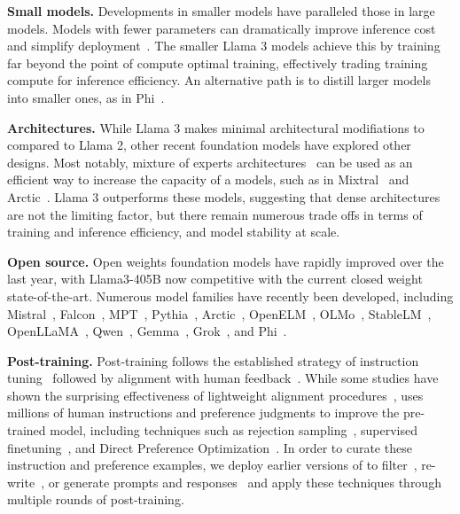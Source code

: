 \documentclass[dvipsnames]{fairmeta}
\begin{document}
\textbf{Small models.}
Developments in smaller models have paralleled those in large models. 
Models with fewer parameters can dramatically improve inference cost and simplify deployment~\citep{mehta2024openelm,team2024gemma}.
The smaller Llama 3 models achieve this by training far beyond the point of compute optimal training, effectively trading training compute for inference efficiency.
An alternative path is to distill larger models into smaller ones, as in Phi~\citep{abdin2024phi}.

\textbf{Architectures.}
While Llama 3 makes minimal architectural modifiations to compared to Llama 2, other recent foundation models have explored other designs. Most notably, mixture of experts architectures~\citep{shazeer2017moe,lewis2021base,fedus2022switch,zhou2022mixture} can be used as an efficient way to increase the capacity of a models, such as in Mixtral~\citep{jiang2024mixtral} and Arctic~\citep{snowflakearctic}. Llama 3 outperforms these models, suggesting that dense architectures are not the limiting factor, but there remain numerous trade offs in terms of training and inference efficiency, and model stability at scale.

\textbf{Open source.}
Open weights foundation models have rapidly improved over the last year, with Llama3-405B now competitive with the current closed weight state-of-the-art. 
Numerous model families have recently been developed, including Mistral~\citep{jiang2023mistral}, Falcon~\citep{almazrouei2023falcon}, MPT~\citep{databricksmpt}, Pythia~\citep{biderman2023pythia}, Arctic~\citep{snowflakearctic}, OpenELM~\citep{mehta2024openelm}, OLMo~\citep{groeneveld2024olmoacceleratingsciencelanguage}, StableLM~\citep{bellagente2024stable}, OpenLLaMA~\citep{openlm2023openllama}, Qwen~\citep{bai2023qwen}, Gemma~\citep{team2024gemma}, Grok~\citep{xaigrok}, and Phi~\citep{abdin2024phi}.

\textbf{Post-training.}
Post-training \llamathree follows the established strategy of instruction tuning~\citep{chung2022scalinginstruction,ouyang2022instructgpt} followed by alignment with human feedback~\citep{kaufmann2023survey}. While some studies have shown the surprising effectiveness of lightweight alignment procedures~\citep{zhou2024lima}, \llamathree uses millions of human instructions and preference judgments to improve the pre-trained model, including techniques such as rejection sampling~\citep{constitutional-ai-bai}, supervised finetuning~\citep{sanh2022multitask}, and Direct Preference Optimization~\citep{rafailov2023dpo}. In order to curate these instruction and preference examples, we deploy earlier versions of \llamathree to filter~\citep{liu2024makesgooddataalignment}, re-write~\citep{pan2024selfcorrection}, or generate prompts and responses~\citep{liu2024bestpractices} and apply these techniques through multiple rounds of post-training.
\end{document}
